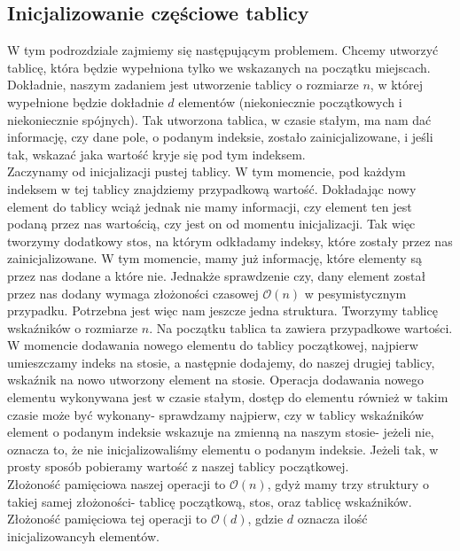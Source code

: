 \documentclass[12pt,a4paper,titlepage]{article}
\newcommand\tab[1][1cm]{\hspace*{#1}}
\begin{document}
\subsection{Inicjalizowanie częściowe tablicy}
\tab[0.6cm]W tym podrozdziale zajmiemy się następującym problemem. Chcemy utworzyć tablicę, która będzie wypełniona tylko we wskazanych na początku miejscach. Dokładnie, naszym zadaniem jest utworzenie tablicy o rozmiarze $n$, w której wypełnione będzie dokładnie $d$ elementów (niekoniecznie początkowych i niekoniecznie spójnych). Tak utworzona tablica, w czasie stałym, ma nam dać informację, czy dane pole, o podanym indeksie, zostało zainicjalizowane, i jeśli tak, wskazać jaka wartość kryje się pod tym indeksem.\\
\tab[0.6cm]Zaczynamy od inicjalizacji pustej tablicy. W tym momencie, pod każdym indeksem w tej tablicy znajdziemy przypadkową wartość. Dokładając nowy element do tablicy wciąż jednak nie mamy informacji, czy element ten jest podaną przez nas wartością, czy jest on od momentu inicjalizacji. Tak więc tworzymy dodatkowy stos, na którym odkładamy indeksy, które zostały przez nas zainicjalizowane. W tym momencie, mamy już informację, które elementy są przez nas dodane a które nie. Jednakże sprawdzenie czy, dany element został przez nas dodany wymaga złożoności czasowej $\mathcal{O}(n)$ w pesymistycznym przypadku. Potrzebna jest więc nam jeszcze jedna struktura. Tworzymy tablicę wskaźników o rozmiarze $n$. Na początku tablica ta zawiera przypadkowe wartości. W momencie dodawania nowego elementu do tablicy początkowej, najpierw umieszczamy indeks na stosie, a następnie dodajemy, do naszej drugiej tablicy, wskaźnik na nowo utworzony element na stosie. Operacja dodawania nowego elementu wykonywana jest w czasie stałym, dostęp do elementu również w takim czasie może być wykonany- sprawdzamy najpierw, czy w tablicy wskaźników element o podanym indeksie wskazuje na zmienną na naszym stosie- jeżeli nie, oznacza to, że nie inicjalizowaliśmy elementu o podanym indeksie. Jeżeli tak, w prosty sposób pobieramy wartość z naszej tablicy początkowej.\\
\tab[0.6cm]Złożoność pamięciowa naszej operacji to $\mathcal{O}(n)$, gdyż mamy trzy struktury o takiej samej złożoności- tablicę początkową, stos, oraz tablicę wskaźników. Złożoność pamięciowa tej operacji to $\mathcal{O}(d)$, gdzie $d$ oznacza ilość inicjalizowancyh elementów.
\end{document}
